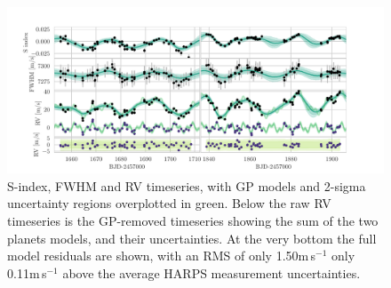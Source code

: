 \documentclass[fleqn,usenatbib]{mnras}
\newcommand{\ms}{m\,s$^{-1}$}
\begin{document}
\begin{figure}
	\includegraphics[width=\textwidth, trim={0.85cm 0.8 1.9cm 0.4cm}]{Combined_RV_plots_3_GPs.pdf}
    \caption{S-index, FWHM and RV timeseries, with GP models and 2-sigma uncertainty regions overplotted in green. Below the raw RV timeseries is the GP-removed timeseries showing the sum of the two planets models, and their uncertainties. At the very bottom the full model residuals are shown, with an RMS of only 1.50\ms{} only 0.11\ms{} above the average HARPS measurement uncertainties.}
    \label{fig:RVs}
\end{figure}
\end{document}
